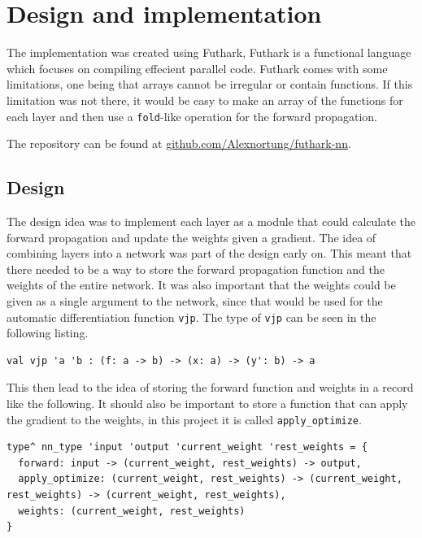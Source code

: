 \section{Design and implementation}%
\label{sec:impl}

The implementation was created using Futhark, Futhark is a functional language which focuses on compiling effecient parallel code.
Futhark comes with some limitations, one being that arrays cannot be irregular or contain functions.
If this limitation was not there, it would be easy to make an array of the functions for each layer and then use a \texttt{fold}-like operation for the forward propagation.

The repository can be found at \href{https://github.com/Alexnortung/futhark-nn}{github.com/Alexnortung/futhark-nn}.

\subsection{Design}

The design idea was to implement each layer as a module that could calculate the forward propagation and update the weights given a gradient.
The idea of combining layers into a network was part of the design early on.
This meant that there needed to be a way to store the forward propagation function and the weights of the entire network.
It was also important that the weights could be given as a single argument to the network, since that would be used for the automatic differentiation function \texttt{vjp}. The type of \texttt{vjp} can be seen in the following listing.
\begin{lstlisting}
val vjp 'a 'b : (f: a -> b) -> (x: a) -> (y': b) -> a
\end{lstlisting}

This then lead to the idea of storing the forward function and weights in a record like the following. It should also be important to store a function that can apply the gradient to the weights, in this project it is called \texttt{apply\_optimize}.

\begin{lstlisting}
type^ nn_type 'input 'output 'current_weight 'rest_weights = {
  forward: input -> (current_weight, rest_weights) -> output,
  apply_optimize: (current_weight, rest_weights) -> (current_weight, rest_weights) -> (current_weight, rest_weights),
  weights: (current_weight, rest_weights)
}
\end{lstlisting}

